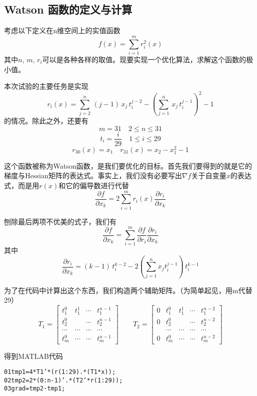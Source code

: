 \documentclass[11pt, a4paper]{article}
\begin{document}
\subsection{Watson 函数的定义与计算}
考虑以下定义在n维空间上的实值函数\[f(x)=\sum_{i=1}^m r_i^2(x)\]其中$n,\,m,\,r_i$可以是各种各样的取值。现要实现一个优化算法，求解这个函数的极小值。

本次试验的主要任务是实现\[r_i(x)=\sum_{j=2}^n\,(j-1)\,x_j\,t_i^{j-2}-\left(\sum_{j=1}^n\,x_j\,t_i^{j-1}\right)^2-1\]的情况。除此之外，还要有
\[m=31\quad 2\le n\le 31\]
\[t_i=\frac{i}{29}\quad 1\le i\le 29\]
\[r_{30}(x)=x_1\quad r_{31}(x)=x_2-x_1^2-1\]

这个函数被称为Watson函数\cite{dennis1996numerical}，是我们要优化的目标。首先我们要得到的就是它的梯度与Hessian矩阵的表达式。事实上，我们没有必要写出$\nabla f$关于自变量$x$的表达式，而是用$r(x)$和它的偏导数进行代替
\[\frac{\partial f}{\partial x_k}=2\sum_{i=1}^m r_i(x)\frac{\partial r_i}{\partial x_k}\]

刨除最后两项不优美的式子，我们有
\[\frac{\partial f}{\partial x_k}=\sum_{i=1}^m\frac{\partial f}{\partial r_i}\frac{\partial r_i}{\partial x_k}\]
其中
\[\frac{\partial r_i}{\partial x_k}=(k-1)\,t_i^{k-2}-2\left(\sum_{j=1}^nx_jt_i^{j-1}\right)\,t_i^{k-1}\]

为了在代码中计算出这个东西，我们构造两个辅助矩阵。（为简单起见，用m代替29）
\begin{equation*}
T_1=
\begin{bmatrix}
t_1^0 & t_1^1 & \cdots & t_1^{n-1}\\
t_2^0 & & \cdots & t_2^{n-1}\\
\cdots & \cdots &\cdots & \cdots\\
t_m^0 & \cdots &\cdots & t_m^{n-1}
\end{bmatrix}
\qquad 
T_2=
\begin{bmatrix}
0 & t_1^0 & t_1^1 & \cdots & t_1^{n-2}\\
0 & t_2^0 & & \cdots & t_2^{n-2}\\
& \cdots & \cdots &\cdots & \cdots\\
0 & t_m^0 & \cdots &\cdots & t_m^{n-2}
\end{bmatrix}
\end{equation*}

得到MATLAB代码

\begin{framed}
\begin{alltt}
	01	tmp1 = 4 * T1' * (r(1:29) .* (T1 * x));
	02	tmp2 = 2 * (0:n-1)' .* (T2' * r(1:29));
	03	grad = tmp2 - tmp1;
\end{alltt}
\end{framed}
\end{document}
